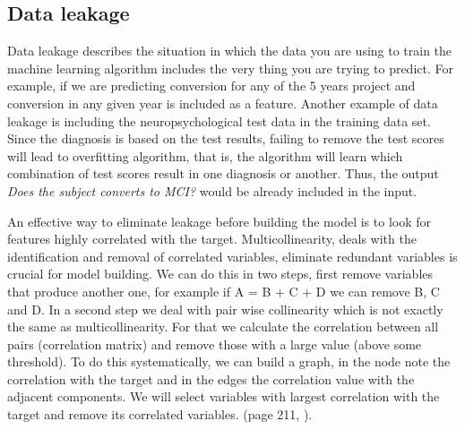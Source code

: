 \documentclass[11pt]{article}
\theoremstyle{definition}
\theoremstyle{remark}
\begin{document}
\subsection{Data leakage}
\label{sse:dl}
Data leakage describes the situation in which the data you are using to train the machine learning algorithm includes the very thing you are trying to predict. For example, if we are predicting conversion for any of the 5 years project and conversion in any given year is included as a feature.
Another example of data leakage is including the neuropsychological test data in the training data set. Since the diagnosis is based on the test results, failing to remove the test scores will lead to overfitting algorithm, that is, the algorithm will learn which combination of test scores result in one diagnosis or another. Thus, the output \emph{Does the subject converts to MCI?} would be already included in the input.


An effective way to eliminate leakage before building the model is to look for features highly correlated with the target. Multicollinearity, deals with the identification and removal of correlated variables, eliminate redundant variables is crucial for model building. We can do this in two steps, first remove variables that produce another one, for example if A = B + C + D we can remove B, C and D. 
In a second step we deal with pair wise collinearity which is not exactly the same as multicollinearity. For that we calculate the correlation between all pairs (correlation matrix) and remove those with a large value (above some threshold). To do this systematically, we can build a graph, in the node note the correlation with the target and in the edges the correlation value with the adjacent components. We will select variables with largest correlation with the target and remove its correlated variables. (page 211, \cite{wu2012foundations}).

\end{document}
